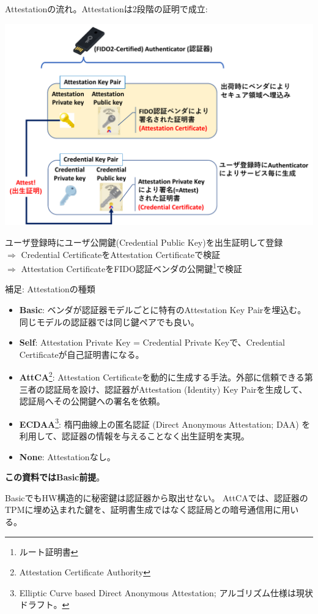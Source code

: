 \documentclass[12pt,dvipdfmx,uplatex]{beamer}
\begin{document}
\begin{frame}
\small 
Attestationの流れ。Attestationは2段階の証明で成立:
\begin{center}
\includegraphics[width=0.7\linewidth]{Figs/webauthn-attestation.pdf}
\end{center}

ユーザ登録時にユーザ公開鍵(Credential Public Key)を出生証明して登録\\
$\Rightarrow$ Credential CertificateをAttestation Certificateで検証\\
$\Rightarrow$ Attestation CertificateをFIDO認証ベンダの公開鍵\footnote[frame]{\scriptsize ルート証明書}で検証
\end{frame}

\begin{frame}
\small
\begin{exampleblock}{\small 補足: Attestationの種類}
\footnotesize
\begin{itemize}
\setlength{\itemsep}{0ex}
 \item \textbf{Basic}: ベンダが認証器モデルごとに特有のAttestation Key Pairを埋込む。同じモデルの認証器では同じ鍵ペアでも良い。
 \item \textbf{Self}: Attestation Private Key = Credential Private Keyで、Credential Certificateが自己証明書になる。
 \item \textbf{AttCA}\footnote[frame]{\scriptsize Attestation Certificate Authority}: Attestation Certificateを動的に生成する手法。外部に信頼できる第三者の認証局を設け、認証器がAttestation (Identity) Key Pairを生成して、認証局へその公開鍵への署名を依頼。
 \item \textbf{ECDAA}\footnote[frame]{\scriptsize Elliptic Curve based Direct Anonymous Attestation; アルゴリズム仕様は現状ドラフト。}: 楕円曲線上の匿名認証 (Direct Anonymous Attestation; DAA) を利用して、認証器の情報を与えることなく出生証明を実現。
 \item \textbf{None}: Attestationなし。
\end{itemize}
\end{exampleblock}
\textbf{この資料ではBasic前提}。

BasicでもHW構造的に\alert{秘密鍵は認証器から取出せない}。
AttCAでは、認証器のTPMに埋め込まれた鍵を、証明書生成ではなく認証局との暗号通信用に用いる。
\end{frame}
\end{document}
